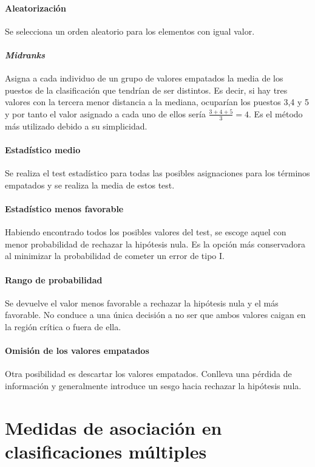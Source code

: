 \paragraph{Aleatorización} Se selecciona un orden aleatorio 
para los elementos con igual valor.

\paragraph{\textit{Midranks}} Asigna a cada individuo de un 
grupo de valores empatados la media de los puestos de la 
clasificación que tendrían de ser distintos. Es decir, si hay 
tres valores con la tercera menor distancia a la mediana, 
ocuparían los puestos 3,4 y 5 y por tanto el valor asignado a 
cada uno de ellos sería $\frac{3+4+5}{3}=4$. Es el método más 
utilizado debido a su simplicidad. 

\paragraph{Estadístico medio} Se realiza el test estadístico 
para todas las posibles asignaciones para los términos 
empatados y se realiza la media de estos test.

\paragraph{Estadístico menos favorable} Habiendo encontrado 
todos los posibles valores del test, se escoge aquel con 
menor probabilidad de rechazar la hipótesis nula. Es la 
opción más conservadora al minimizar la probabilidad de 
cometer un error de tipo I.

\paragraph{Rango de probabilidad} Se devuelve el valor menos 
favorable a rechazar la hipótesis nula y el más favorable. No 
conduce a una única decisión a no ser que ambos valores 
caigan en la región crítica o fuera de ella.

\paragraph{Omisión de los valores empatados} Otra posibilidad 
es descartar los valores empatados. Conlleva una pérdida de 
información y generalmente introduce un sesgo hacia rechazar 
la hipótesis nula.

	
\section{Medidas de asociación en clasificaciones múltiples}	

